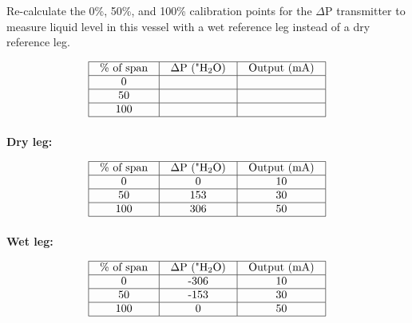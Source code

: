 Re-calculate the 0\%, 50\%, and 100\% calibration points for the $\Delta$P transmitter to measure liquid level in this vessel with a wet reference leg instead of a dry reference leg.


$$\vbox{\offinterlineskip
\halign{\strut
\vrule \quad\hfil # \ \hfil & 
\vrule \quad\hfil # \ \hfil & 
\vrule \quad\hfil # \ \hfil \vrule \cr
\noalign{\hrule}
%
\% of span & $\Delta$P ("H$_{2}$O) & Output (mA) \cr
%
\noalign{\hrule}
%
0 &  &  \cr
%
\noalign{\hrule}
%
50 &  &  \cr
%
\noalign{\hrule}
%
100 &  &  \cr
%
\noalign{\hrule}
} %
}$$ %







{\bf Dry leg:}


$$\vbox{\offinterlineskip
\halign{\strut
\vrule \quad\hfil # \ \hfil & 
\vrule \quad\hfil # \ \hfil & 
\vrule \quad\hfil # \ \hfil \vrule \cr
\noalign{\hrule}
%
\% of span & $\Delta$P ("H$_{2}$O) & Output (mA) \cr
%
\noalign{\hrule}
%
0 & 0 & 10 \cr
%
\noalign{\hrule}
%
50 & 153 & 30 \cr
%
\noalign{\hrule}
%
100 & 306 & 50 \cr
%
\noalign{\hrule}
} %
}$$ %

\vskip 10pt

{\bf Wet leg:}


$$\vbox{\offinterlineskip
\halign{\strut
\vrule \quad\hfil # \ \hfil & 
\vrule \quad\hfil # \ \hfil & 
\vrule \quad\hfil # \ \hfil \vrule \cr
\noalign{\hrule}
%
\% of span & $\Delta$P ("H$_{2}$O) & Output (mA) \cr
%
\noalign{\hrule}
%
0 & -306 & 10 \cr
%
\noalign{\hrule}
%
50 & -153 & 30 \cr
%
\noalign{\hrule}
%
100 & 0 & 50 \cr
%
\noalign{\hrule}
} %
}$$ %














